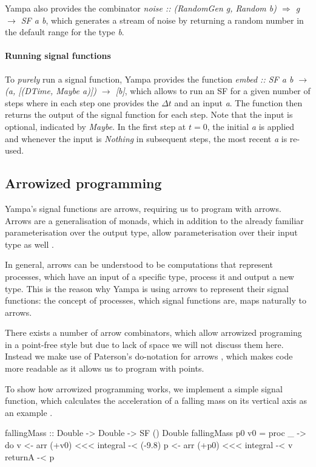 Yampa also provides the combinator \textit{noise :: (RandomGen g, Random b) $\Rightarrow$ g $\rightarrow$ SF a b}, which generates a stream of noise by returning a random number in the default range for the type \textit{b}.

\paragraph{Running signal functions}
To \textit{purely} run a signal function, Yampa provides the function \textit{embed :: SF a b $\rightarrow$ (a, [(DTime, Maybe a)]) $\rightarrow$ [b]}, which allows to run an SF for a given number of steps where in each step one provides the $\Delta t$ and an input \textit{a}. The function then returns the output of the signal function for each step. Note that the input is optional, indicated by \textit{Maybe}. In the first step at $t = 0$, the initial \textit{a} is applied and whenever the input is \textit{Nothing} in subsequent steps, the most recent \textit{a} is re-used.

\subsection{Arrowized programming}
Yampa's signal functions are arrows, requiring us to program with arrows. Arrows are a generalisation of monads, which in addition to the already familiar parameterisation over the output type, allow parameterisation over their input type as well \cite{hughes_generalising_2000, hughes_programming_2005}.

In general, arrows can be understood to be computations that represent processes, which have an input of a specific type, process it and output a new type. This is the reason why Yampa is using arrows to represent their signal functions: the concept of processes, which signal functions are, maps naturally to arrows.

There exists a number of arrow combinators, which allow arrowized programing in a point-free style but due to lack of space we will not discuss them here. Instead we make use of Paterson's do-notation for arrows \cite{paterson_new_2001}, which makes code more readable as it allows us to program with points.

To show how arrowized programming works, we implement a simple signal function, which calculates the acceleration of a falling mass on its vertical axis as an example \cite{perez_testing_2017}.

\begin{HaskellCode}
fallingMass :: Double -> Double -> SF () Double
fallingMass p0 v0 = proc _ -> do
  v <- arr (+v0) <<< integral -< (-9.8)
  p <- arr (+p0) <<< integral -< v
  returnA -< p
\end{HaskellCode}

